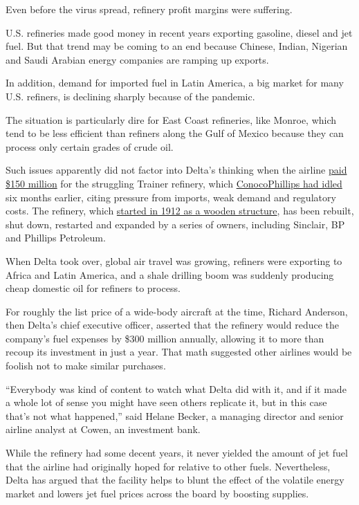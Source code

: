 Even before the virus spread, refinery profit margins were suffering.

U.S. refineries made good money in recent years exporting gasoline,
diesel and jet fuel. But that trend may be coming to an end because
Chinese, Indian, Nigerian and Saudi Arabian energy companies are ramping
up exports.

In addition, demand for imported fuel in Latin America, a big market for
many U.S. refiners, is declining sharply because of the pandemic.

The situation is particularly dire for East Coast refineries, like
Monroe, which tend to be less efficient than refiners along the Gulf of
Mexico because they can process only certain grades of crude oil.

Such issues apparently did not factor into Delta's thinking when the
airline
\href{https://www.nytimes3xbfgragh.onion/2012/05/01/business/delta-air-lines-to-buy-refinery.html}{paid
\$150 million} for the struggling Trainer refinery, which
\href{http://www.conocophillips.com/news-media/story/conocophillips-seeks-buyer-for-trainer-pa-refinery/}{ConocoPhillips
had idled} six months earlier, citing pressure from imports, weak demand
and regulatory costs. The refinery, which
\href{https://www.monroe-energy.com/the-facilities/history-today/}{started
in 1912 as a wooden structure}, has been rebuilt, shut down, restarted
and expanded by a series of owners, including Sinclair, BP and Phillips
Petroleum.

When Delta took over, global air travel was growing, refiners were
exporting to Africa and Latin America, and a shale drilling boom was
suddenly producing cheap domestic oil for refiners to process.

For roughly the list price of a wide-body aircraft at the time, Richard
Anderson, then Delta's chief executive officer, asserted that the
refinery would reduce the company's fuel expenses by \$300 million
annually, allowing it to more than recoup its investment in just a year.
That math suggested other airlines would be foolish not to make similar
purchases.

``Everybody was kind of content to watch what Delta did with it, and if
it made a whole lot of sense you might have seen others replicate it,
but in this case that's not what happened,'' said Helane Becker, a
managing director and senior airline analyst at Cowen, an investment
bank.

While the refinery had some decent years, it never yielded the amount of
jet fuel that the airline had originally hoped for relative to other
fuels. Nevertheless, Delta has argued that the facility helps to blunt
the effect of the volatile energy market and lowers jet fuel prices
across the board by boosting supplies.

